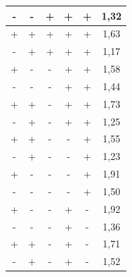 \begin{table}[H]
\begin{tabular}{|c|c|c|c|c|c|}
  \rowcolor[HTML]{EFEFEF} 
  -              & -               & +                & +                 & +                  & 1,32           \\ \hline
  +              & +               & +                & +                 & +                  & 1,63           \\ \hline
  \rowcolor[HTML]{EFEFEF} 
  -              & +               & +                & +                 & +                  & 1,17           \\ \hline
  +              & -               & -                & +                 & +                  & 1,58           \\ \hline
  \rowcolor[HTML]{EFEFEF} 
  -              & -               & -                & +                 & +                  & 1,44           \\ \hline
  +              & +               & -                & +                 & +                  & 1,73           \\ \hline
  \rowcolor[HTML]{EFEFEF} 
  -              & +               & -                & +                 & +                  & 1,25           \\ \hline
  +              & +               & -                & -                 & +                  & 1,55           \\ \hline
  \rowcolor[HTML]{EFEFEF} 
  -              & +               & -                & -                 & +                  & 1,23           \\ \hline
  +              & -               & -                & -                 & +                  & 1,91           \\ \hline
  \rowcolor[HTML]{EFEFEF} 
  -              & -               & -                & -                 & +                  & 1,50           \\ \hline
  +              & -               & -                & +                 & -                  & 1,92           \\ \hline
  \rowcolor[HTML]{EFEFEF} 
  -              & -               & -                & +                 & -                  & 1,36           \\ \hline
  +              & +               & -                & +                 & -                  & 1,71           \\ \hline
  \rowcolor[HTML]{EFEFEF} 
  -              & +               & -                & +                 & -                  & 1,52           \\ \hline

\end{tabular}
\end{table}
